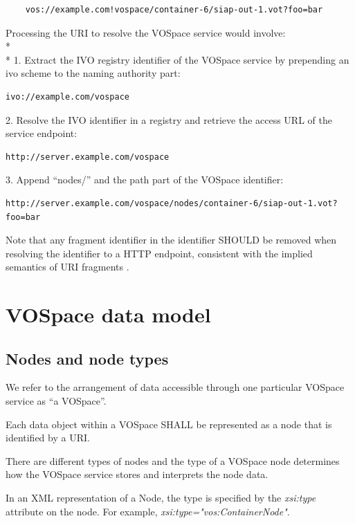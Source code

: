 \documentclass[11pt,a4paper]{ivoa}
\begin{document}
\begin{verbatim}
    vos://example.com!vospace/container-6/siap-out-1.vot?foo=bar
\end{verbatim}

\noindent
Processing the URI to resolve the VOSpace service would involve:
\\* \\*
1.  Extract the IVO registry identifier of the VOSpace service by prepending an ivo scheme to the naming authority part:
\begin{verbatim}
ivo://example.com/vospace
\end{verbatim}
2.  Resolve the IVO identifier in a registry and retrieve the access URL of the service endpoint:
\begin{verbatim}
http://server.example.com/vospace
\end{verbatim}
3.  Append ``nodes/'' and the path part of the VOSpace identifier:
\begin{verbatim}
http://server.example.com/vospace/nodes/container-6/siap-out-1.vot?foo=bar
\end{verbatim}

Note that any fragment identifier in the identifier SHOULD be removed when resolving the identifier to a HTTP endpoint, consistent with the implied semantics of URI fragments \citep{note:uriforms}.

\section{VOSpace data model}
\label{sec:vospace data model}

\subsection{Nodes and node types}
\label{subsec:nodes and node types}

We refer to the arrangement of data accessible through one particular VOSpace service as ``a VOSpace''.

Each data object within a VOSpace SHALL be represented as a node that is identified by a URI.

There are different types of nodes and the type of a VOSpace node determines how the VOSpace service stores and interprets the node data.

In an XML representation of a Node, the type is specified by the \emph{xsi:type} attribute on the node.  For example, \emph{xsi:type="vos:ContainerNode"}.
\end{document}
